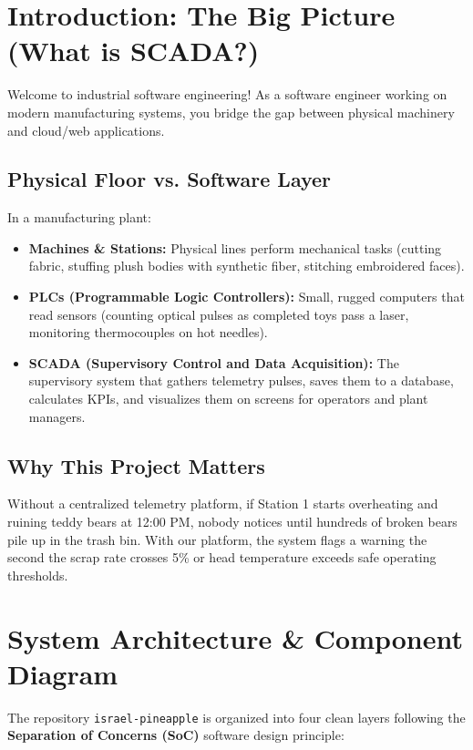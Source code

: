 \documentclass[11pt,letterpaper]{article}
\begin{document}
\newpage
\tableofcontents
\newpage

\section{Introduction: The Big Picture (What is SCADA?)}

Welcome to industrial software engineering! As a software engineer working on modern manufacturing systems, you bridge the gap between physical machinery and cloud/web applications.

\subsection{Physical Floor vs. Software Layer}
In a manufacturing plant:
\begin{itemize}[leftmargin=*]
    \item \textbf{Machines \& Stations:} Physical lines perform mechanical tasks (cutting fabric, stuffing plush bodies with synthetic fiber, stitching embroidered faces).
    \item \textbf{PLCs (Programmable Logic Controllers):} Small, rugged computers that read sensors (counting optical pulses as completed toys pass a laser, monitoring thermocouples on hot needles).
    \item \textbf{SCADA (Supervisory Control and Data Acquisition):} The supervisory system that gathers telemetry pulses, saves them to a database, calculates KPIs, and visualizes them on screens for operators and plant managers.
\end{itemize}

\subsection{Why This Project Matters}
Without a centralized telemetry platform, if Station 1 starts overheating and ruining teddy bears at 12:00 PM, nobody notices until hundreds of broken bears pile up in the trash bin. With our platform, the system flags a warning the second the scrap rate crosses 5\% or head temperature exceeds safe operating thresholds.

\section{System Architecture \& Component Diagram}

The repository \texttt{israel-pineapple} is organized into four clean layers following the \textbf{Separation of Concerns (SoC)} software design principle:
\end{document}

